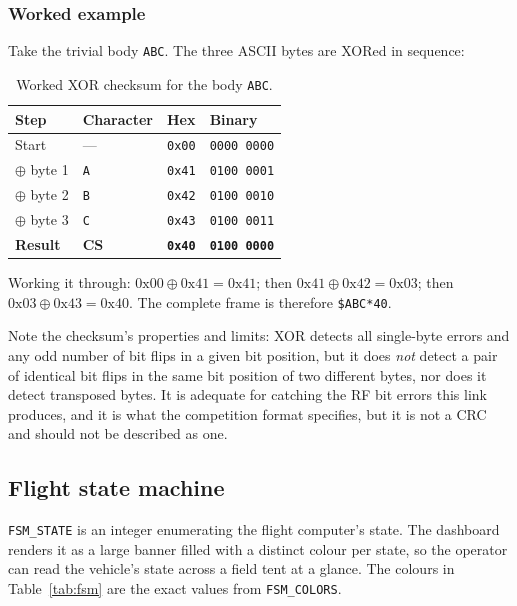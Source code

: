 \documentclass[11pt,a4paper]{article}
\newcommand{\code}[1]{\texttt{#1}}
\begin{document}
\subsubsection*{Worked example}

Take the trivial body \code{ABC}. The three ASCII bytes are XORed in
sequence:

\begin{table}[htbp]
\centering
\caption{Worked XOR checksum for the body \texttt{ABC}.}
\label{tab:xor}
\small
\begin{tabular}{@{}llll@{}}
\toprule
\textbf{Step} & \textbf{Character} & \textbf{Hex} & \textbf{Binary}\\
\midrule
Start           & ---        & \code{0x00} & \code{0000 0000}\\
$\oplus$ byte 1 & \code{A}   & \code{0x41} & \code{0100 0001}\\
$\oplus$ byte 2 & \code{B}   & \code{0x42} & \code{0100 0010}\\
$\oplus$ byte 3 & \code{C}   & \code{0x43} & \code{0100 0011}\\
\midrule
\textbf{Result} & \textbf{CS} & \textbf{\code{0x40}} & \textbf{\code{0100 0000}}\\
\bottomrule
\end{tabular}
\end{table}

Working it through: $0\text{x}00 \oplus 0\text{x}41 = 0\text{x}41$; then
$0\text{x}41 \oplus 0\text{x}42 = 0\text{x}03$; then
$0\text{x}03 \oplus 0\text{x}43 = 0\text{x}40$. The complete frame is
therefore \code{\$ABC*40}.

Note the checksum's properties and limits: XOR detects all single-byte errors
and any odd number of bit flips in a given bit position, but it does
\emph{not} detect a pair of identical bit flips in the same bit position of
two different bytes, nor does it detect transposed bytes. It is adequate for
catching the RF bit errors this link produces, and it is what the competition
format specifies, but it is not a CRC and should not be described as one.

\subsection{Flight state machine}

\code{FSM\_STATE} is an integer enumerating the flight computer's state. The
dashboard renders it as a large banner filled with a distinct colour per
state, so the operator can read the vehicle's state across a field tent at a
glance. The colours in Table~\ref{tab:fsm} are the exact values from
\code{FSM\_COLORS}.
\end{document}
